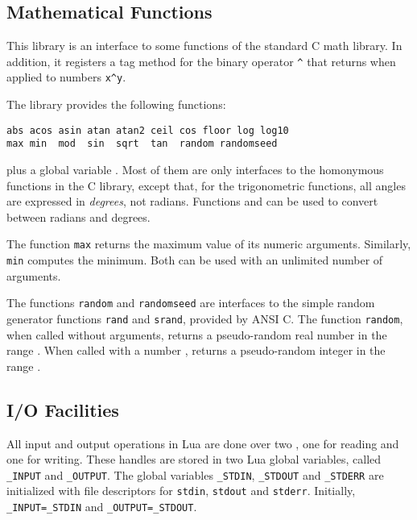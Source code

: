 \subsection{Mathematical Functions} \label{mathlib}

This library is an interface to some functions of the standard C math library.
In addition, it registers a tag method for the binary operator \verb|^| that
returns  when applied to numbers \verb|x^y|.

The library provides the following functions:
\begin{verbatim}
abs acos asin atan atan2 ceil cos floor log log10
max min  mod  sin  sqrt  tan  random randomseed
\end{verbatim}
plus a global variable .
Most of them
are only interfaces to the homonymous functions in the C library,
except that, for the trigonometric functions,
all angles are expressed in \emph{degrees}, not radians.
Functions  and  can be used to convert
between radians and degrees.

The function \verb|max| returns the maximum
value of its numeric arguments.
Similarly, \verb|min| computes the minimum.
Both can be used with an unlimited number of arguments.

The functions \verb|random| and \verb|randomseed| are interfaces to
the simple random generator functions \verb|rand| and \verb|srand|,
provided by ANSI C.
The function \verb|random|, when called without arguments,
returns a pseudo-random real number in the range \Math{[0,1)}.
When called with a number ,
returns a pseudo-random integer in the range \Math{[1,n]}.


\subsection{I/O Facilities} \label{libio}

All input and output operations in Lua are done over two
, one for reading and one for writing.
These handles are stored in two Lua global variables,
called \verb|_INPUT| and \verb|_OUTPUT|.
The global variables
\verb|_STDIN|, \verb|_STDOUT| and \verb|_STDERR|
are initialized with file descriptors for
\verb|stdin|, \verb|stdout| and \verb|stderr|.
Initially, \verb|_INPUT=_STDIN| and \verb|_OUTPUT=_STDOUT|.

